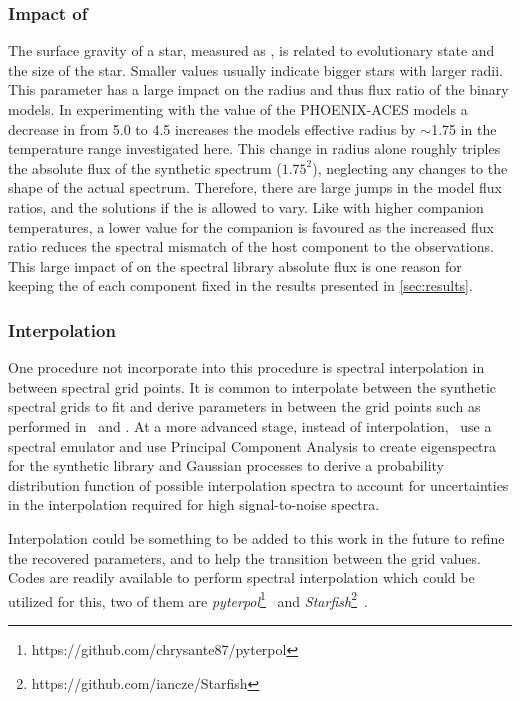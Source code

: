 \subsubsection{Impact of \Logg{}}
\label{subsubsec:logg} 
The surface gravity of a star, measured as \Logg{}, is related to evolutionary state and the size of the star.
Smaller \Logg{} values usually indicate bigger stars with larger radii.
This parameter has a large impact on the radius and thus flux ratio of the binary models.
In experimenting with the \Logg{} value of the {PHOENIX-ACES} models a decrease in \Logg{} from 5.0 to 4.5 increases the models effective radius by \(\sim\)1.75 in the temperature range investigated here.
This change in radius alone roughly triples the absolute flux of the synthetic spectrum (\(1.75^2\)), neglecting any changes to the shape of the actual spectrum.
Therefore, there are large jumps in the model flux ratios, and the \textchisquared{} solutions if the \Logg{} is allowed to vary.
Like with higher companion temperatures, a lower \Logg{} value for the companion is favoured as the increased flux ratio reduces the spectral mismatch of the host component to the observations.
This large impact of \Logg{} on the spectral library absolute flux is one reason for keeping the \Logg{} of each component fixed in the \textchisquared{} results presented in \cref{sec:results}.

\subsubsection{Interpolation}
\label{subsubsec:interpolation}
One procedure not incorporate into this \textchisquared{} procedure is spectral interpolation in between spectral grid points.
It is common to interpolate between the synthetic spectral grids to fit and derive parameters in between the grid points such as performed in~\citet{nemravova_xtauri_2016} and \citet{passegger_fundamental_2016}.
At a more advanced stage, instead of interpolation,~\cite{czekala_constructing_2015} use a spectral emulator and use Principal Component Analysis to create eigenspectra for the synthetic library and Gaussian processes to derive a probability distribution function of possible interpolation spectra to account for uncertainties in the interpolation required for high signal-to-noise spectra.

Interpolation could be something to be added to this work in the future to refine the recovered parameters, and to help the transition between the grid \Logg{} values.
Codes are readily available to perform spectral interpolation which could be utilized for this, two of them are \emph{pyterpol}\footnote{https://github.com/chrysante87/pyterpol}~\citet{nemravova_xtauri_2016} and \emph{Starfish}\footnote{https://github.com/iancze/Starfish}~\cite{czekala_constructing_2015}.


